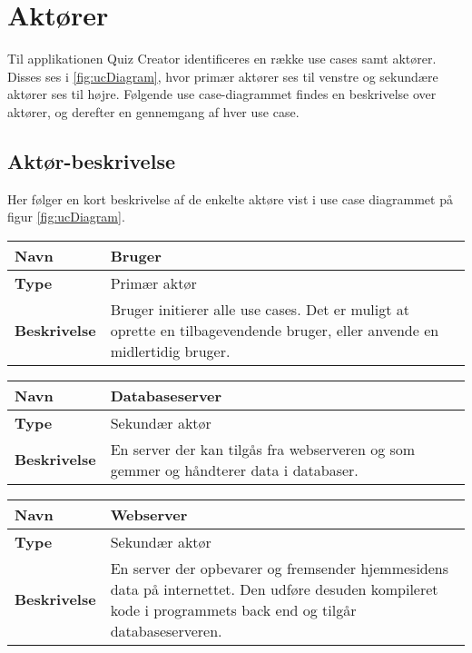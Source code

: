 \section{Aktører}

Til applikationen Quiz Creator identificeres en række use cases samt aktører. Disses ses i \ref{fig:ucDiagram}, hvor primær aktører ses til venstre og sekundære aktører ses til højre. Følgende use case-diagrammet findes en beskrivelse over aktører, og derefter en gennemgang af hver use case. 



\subsection{Aktør-beskrivelse}
Her følger en kort beskrivelse af de enkelte aktøre vist i use case diagrammet på figur \ref{fig:ucDiagram}.

\begin{tabular}{|p{2cm}|p{12cm}|}

\hline 
\textbf{Navn} & Bruger \\ 
\hline 
\textbf{Type} & Primær aktør \\ 
\hline 
\textbf{Beskrivelse} & Bruger initierer alle use cases. Det er muligt at oprette en tilbagevendende bruger, eller anvende en midlertidig bruger.\\ 
\hline 

\end{tabular} 

\begin{tabular}{|p{2cm}|p{12cm}|}

\hline 
\textbf{Navn} & Databaseserver \\ 
\hline 
\textbf{Type} & Sekundær aktør \\ 
\hline 
\textbf{Beskrivelse} & En server der kan tilgås fra webserveren og som gemmer og håndterer data i databaser.\\ 
\hline 

\end{tabular} 

\begin{tabular}{|p{2cm}|p{12cm}|}

\hline 
\textbf{Navn} & Webserver \\ 
\hline 
\textbf{Type} & Sekundær aktør \\ 
\hline 
\textbf{Beskrivelse} & En server der opbevarer og fremsender hjemmesidens data på internettet. Den udføre desuden kompileret kode i programmets back end og tilgår databaseserveren. \\ 
\hline 

\end{tabular} 